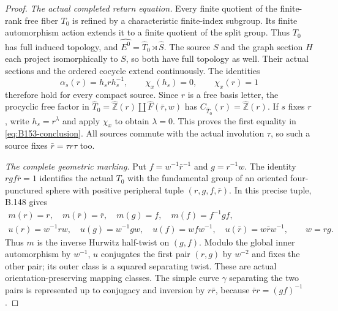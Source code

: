 \begin{proof}
\emph{The actual completed return equation.}
Every finite quotient of the finite-rank free fiber $T_0$ is refined by
a characteristic finite-index subgroup. Its finite automorphism action
extends it to a finite quotient of the split group. Thus $T_0$ has full
induced topology, and
$\widehat{E^0}=\widehat T_0\rtimes\widehat S$.
The source $S$ and the graph section $H$ each project isomorphically to
$S$, so both have full topology as well. Their actual sections and the
ordered cocycle extend continuously. The identities
\[
 \alpha_s(r)=h_srh_s^{-1},\qquad\chi_x(h_s)=0,
 \qquad\chi_x(r)=1
\]
therefore hold for every compact source. Since $r$ is a free basis
letter, the procyclic free factor in
$\widehat T_0=\widehat{\mathbb Z}(r)\amalg\widehat F(\bar r,w)$
has $C_{\widehat T_0}(r)=\widehat{\mathbb Z}(r)$.
If $s$ fixes $r$, write $h_s=r^\lambda$ and apply $\chi_x$ to obtain
$\lambda=0$. This proves the first equality in
\eqref{eq:B153-conclusion}. All sources commute with the actual
involution $\tau$, so such a source fixes $\bar r=\tau r\tau$ too.

\emph{The complete geometric marking.}
Put $f=w^{-1}\bar r^{-1}$ and $g=r^{-1}w$. The identity
$rgf\bar r=1$ identifies the actual $T_0$ with the fundamental group
of an oriented four-punctured sphere with positive peripheral tuple
$(r,g,f,\bar r)$. In this precise tuple, B.148 gives
\begin{equation}\label{eq:B153-geometric-actions}
\begin{gathered}
 m(r)=r,\quad m(\bar r)=\bar r,\quad
 m(g)=f,\quad m(f)=f^{-1}gf,\\
 u(r)=w^{-1}rw,\quad u(g)=w^{-1}gw,\quad
 u(f)=wfw^{-1},\quad u(\bar r)=w\bar r w^{-1},
 \qquad w=rg.
\end{gathered}
\end{equation}
Thus $m$ is the inverse Hurwitz half-twist on $(g,f)$. Modulo the
global inner automorphism by $w^{-1}$, $u$ conjugates the first pair
$(r,g)$ by $w^{-2}$ and fixes the other pair; its outer class is a
squared separating twist. These are actual orientation-preserving
mapping classes. The simple curve $\gamma$ separating the two pairs
is represented up to conjugacy and inversion by $r\bar r$, because
$\bar r r=(gf)^{-1}$.


\end{proof}

